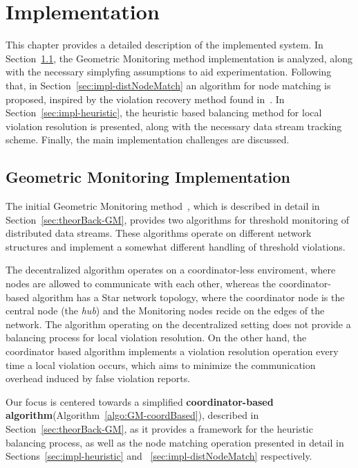 \chapter{Implementation} \label{chap:impl}

This chapter provides a detailed description of the implemented system. In Section~\ref{sec:impl-GM}, the Geometric Monitoring method implementation is analyzed, along with the necessary simplyfing assumptions to aid experimentation. Following that, in Section~\ref{sec:impl-distNodeMatch} an algorithm for node matching is proposed, inspired by the violation recovery method found in~\cite{Keren2014GMHetStreams}. In Section~\ref{sec:impl-heuristic}, the heuristic based balancing method for local violation resolution is presented, along with the necessary data stream tracking scheme. Finally, the main implementation challenges are discussed.
\section{Geometric Monitoring Implementation} \label{sec:impl-GM}

The initial Geometric Monitoring method~\cite{Sharfman2006GM}, which is described in detail in Section~\ref{sec:theorBack-GM}, provides two algorithms for threshold monitoring of distributed data streams. These algorithms operate on different network structures and implement a somewhat different handling of threshold violations.

The decentralized algorithm operates on a coordinator-less enviroment, where nodes are allowed to communicate with each other, whereas the coordinator-based algorithm has a Star network topology, where the coordinator node is the central node (the \emph{hub}) and the Monitoring nodes recide on the edges of the network.
The algorithm operating on the decentralized setting does not provide a balancing process for local violation resolution. On the other hand, the coordinator based algorithm implements a violation resolution operation every time a local violation occurs, which aims to minimize the communication overhead induced by false violation reports. 

Our focus is centered towards a simplified \textbf{coordinator-based algorithm}(Algorithm~\ref{algo:GM-coordBased}), described in Section~\ref{sec:theorBack-GM}, as it provides a framework for the heuristic balancing process, as well as the node matching operation presented in detail in Sections~\ref{sec:impl-heuristic} and ~\ref{sec:impl-distNodeMatch} respectively.

